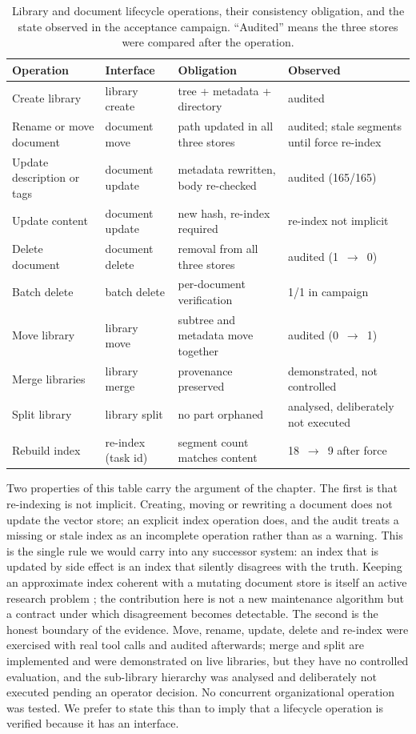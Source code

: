 \begin{table}[t]
\centering
\small
\caption{Library and document lifecycle operations, their consistency
obligation, and the state observed in the acceptance campaign. ``Audited''
means the three stores were compared after the operation.}
\label{tab:org-lifecycle}
\begin{tabular}{@{}p{}p{}p{}p{}@{}}
\toprule
Operation & Interface & Obligation & Observed \\
\midrule
Create library & library create & tree + metadata + directory & audited \\
Rename or move document & document move & path updated in all three stores & audited; stale segments until force re-index \\
Update description or tags & document update & metadata rewritten, body re-checked & audited (165/165) \\
Update content & document update & new hash, re-index required & re-index not implicit \\
Delete document & document delete & removal from all three stores & audited (1~$\rightarrow$~0) \\
Batch delete & batch delete & per-document verification & 1/1 in campaign \\
Move library & library move & subtree and metadata move together & audited (0~$\rightarrow$~1) \\
Merge libraries & library merge & provenance preserved & demonstrated, not controlled \\
Split library & library split & no part orphaned & analysed, deliberately not executed \\
Rebuild index & re-index (task id) & segment count matches content & 18~$\rightarrow$~9 after force \\
\bottomrule
\end{tabular}
\end{table}

Two properties of this table carry the argument of the chapter. The first is
that re-indexing is not implicit. Creating, moving or rewriting a document
does not update the vector store; an explicit index operation does, and the
audit treats a missing or stale index as an incomplete operation rather than
as a warning. This is the single rule we would carry into any successor
system: an index that is updated by side effect is an index that silently
disagrees with the truth. Keeping an approximate index coherent with a
mutating document store is itself an active research problem
\citep{xu-spfresh-2023}; the contribution here is not a new maintenance
algorithm but a contract under which disagreement becomes detectable. The
second is the honest boundary of the evidence.
Move, rename, update, delete and re-index were exercised with real tool calls
and audited afterwards; merge and split are implemented and were demonstrated
on live libraries, but they have no controlled evaluation, and the
sub-library hierarchy was analysed and deliberately not executed pending an
operator decision. No concurrent organizational operation was tested. We
prefer to state this than to imply that a lifecycle operation is verified
because it has an interface.

